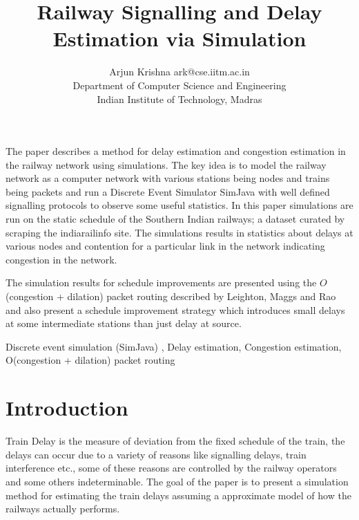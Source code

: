 \documentclass[twoside,11pt]{article}
\begin{document}
\title{Railway Signalling and Delay Estimation via Simulation}

\author{\name Arjun Krishna \email ark@cse.iitm.ac.in \\
       \addr Department of Computer Science and Engineering\\
       Indian Institute of Technology, Madras\\}

\editor{}

\maketitle

\begin{abstract}%

\end{abstract}
	The paper describes a method for delay estimation and congestion estimation in the railway 
	network using simulations.
	The key idea is to model the railway network as a computer network with
	various stations being nodes and trains being packets and run a Discrete Event
	Simulator SimJava with well defined signalling protocols to observe 
	some useful statistics.
	In this paper simulations are run on the static schedule of the Southern Indian railways; a dataset curated by scraping the indiarailinfo site.
	The simulations results in statistics about delays at various nodes and contention 
	for a particular link in the network indicating congestion in the network.
	
	The simulation results for schedule improvements are presented using the 
	$O$(congestion + dilation) packet routing described by Leighton, Maggs and Rao \cite{LMR} and also present a schedule improvement strategy which
	introduces small delays at some intermediate stations than just delay at source.  \\
	
\begin{keywords}
  Discrete event simulation (SimJava) , Delay estimation, Congestion estimation, 
  O(congestion + dilation) packet routing
\end{keywords}

\section{Introduction}

Train Delay is the measure of deviation from the fixed schedule of the train, 
the delays can occur due to a variety of reasons like signalling delays, train interference etc., some of these reasons are controlled by the railway operators
and some others indeterminable. The goal of the paper is to present a simulation
method for estimating the train delays assuming a approximate model of how 
the railways actually performs. \\ 
\end{document}
